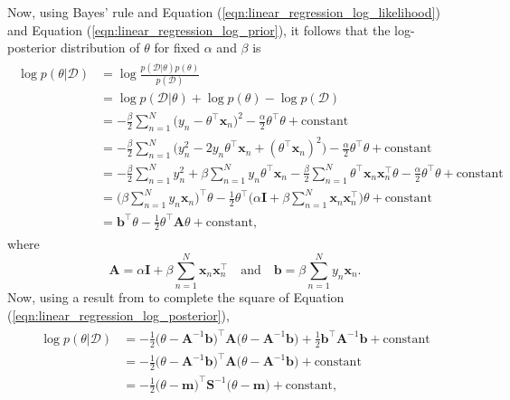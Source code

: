 \documentclass[msc,deptreport.inf]{infthesis} %
\newcommand{\matr}[1]{\mathbf{#1}}
\begin{document}
Now, using Bayes' rule and Equation (\ref{eqn:linear_regression_log_likelihood}) and Equation (\ref{eqn:linear_regression_log_prior}), it follows that the log-posterior distribution of $\theta$ for fixed $\alpha$ and $\beta$ is 
\begin{align}\label{eqn:linear_regression_log_posterior}
\begin{split}
	\log p(\theta | \mathcal{D}) 
	& = \log \frac{p(\mathcal{D} | \theta) p(\theta)}{p(\mathcal{D})} \\
	& = \log p(\mathcal{D} | \theta) + \log p(\theta) - \log p(\mathcal{D}) \\
	& = -\frac{\beta}{2} \sum_{n=1}^N \big(y_n - \theta^\intercal \matr{x}_n \big)^2 
	-\frac{\alpha}{2} \theta^\intercal \theta 
	+ \text{constant} \\
	& = -\frac{\beta}{2} \sum_{n=1}^N\big( y_n^2 - 2 y_n \theta^\intercal \matr{x}_n + (\theta^\intercal \matr{x}_n)^2 \big)
	-\frac{\alpha}{2} \theta^\intercal \theta
	+ \text{constant} \\
	& = -\frac{\beta}{2} \sum_{n=1}^N y_n^2
	+ \beta \sum_{n=1}^N y_n \theta^\intercal \matr{x}_n
	-\frac{\beta}{2} \sum_{n=1}^N \theta^\intercal \matr{x}_n \matr{x}_n^\intercal \theta
	-\frac{\alpha}{2} \theta^\intercal \theta
	+ \text{constant} \\
	& = \Big(\beta \sum_{n=1}^N y_n \matr{x}_n \Big)^\intercal \theta 
	-\frac{1}{2} \theta^\intercal \Big( \alpha \matr{I} + \beta \sum_{n=1}^N \matr{x}_n \matr{x}_n^\intercal \Big) \theta 
	+ \text{constant} \\
	& = \matr{b}^\intercal \theta 
	- \frac{1}{2} \theta^\intercal \matr{A} \theta 
	+ \text{constant},
\end{split}
\end{align}
where 
\begin{equation}\label{eqn:linear_model_A_and_b}
	\matr{A} = \alpha \matr{I} + \beta \sum_{n=1}^N \matr{x}_n \matr{x}_n^\intercal
	\quad \text{and} \quad 
	\matr{b} = \beta \sum_{n=1}^N y_n \matr{x}_n.
\end{equation}
Now, using a result from \cite{barber2007} to complete the square of Equation (\ref{eqn:linear_regression_log_posterior}),
\begin{align}
\begin{split}
	\log p(\theta | \mathcal{D}) 
	& = -\frac{1}{2} \big(\theta - \matr{A}^{-1} \matr{b} \big)^\intercal \matr{A} \big(\theta - \matr{A}^{-1} \matr{b} \big)
	+ \frac{1}{2} \matr{b}^\intercal \matr{A}^{-1} \matr{b}
	+ \text{constant} \\
	& = -\frac{1}{2} \big(\theta - \matr{A}^{-1} \matr{b} \big)^\intercal \matr{A} \big(\theta - \matr{A}^{-1} \matr{b} \big)
	+ \text{constant} \\
	& = -\frac{1}{2} \big(\theta - \matr{m} \big)^\intercal \matr{S}^{-1} \big(\theta - \matr{m} \big)
	+ \text{constant},
\end{split}
\end{align}
\end{document}
